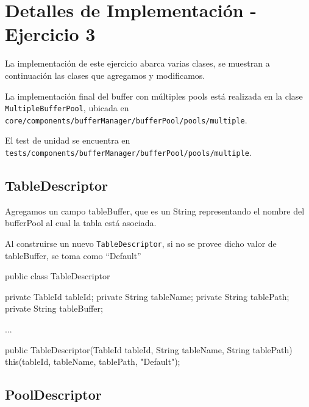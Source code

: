 \section{Detalles de Implementaci\'on - Ejercicio 3}

La implementación de este ejercicio abarca varias clases, 
se muestran a continuación las clases que agregamos y modificamos.

\vspace*{0.2cm}

La implementación final del buffer con múltiples pools está realizada 
en la clase \newline
\texttt{MultipleBufferPool}, ubicada en
\texttt{\small core/components/bufferManager/bufferPool/pools/multiple}.

\vspace*{0.2cm}

\noindent
El test de unidad se encuentra en 
\texttt{\small tests/components/bufferManager/bufferPool/pools/multiple}.


\subsection{TableDescriptor}

Agregamos un campo tableBuffer, que es un String representando
el nombre del bufferPool al cual la tabla está asociada.

\vspace*{0.3cm}

Al construirse un nuevo \texttt{TableDescriptor}, si no se
provee dicho valor de tableBuffer, se toma como ``Default''

\vspace*{-0.2cm}
\begin{verbatimtab}[4]
public class TableDescriptor
{
	private TableId tableId;
	private String tableName;
	private String tablePath;	
	private String tableBuffer;

	...

	public TableDescriptor(TableId tableId, String tableName, String tablePath)
	{
		this(tableId, tableName, tablePath, "Default");
	}
}
\end{verbatimtab}


\subsection{PoolDescriptor}

